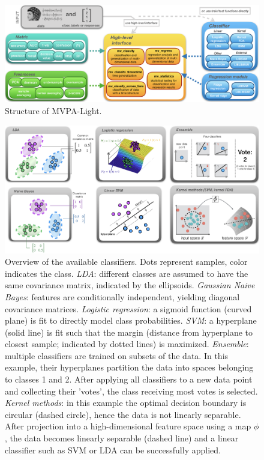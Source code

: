 \documentclass[utf8]{frontiersSCNS} %
\begin{document}
\begin{figure}[ht!]
\centering\includegraphics[width=\linewidth]{fig1_MVPA_structure}
\caption{Structure of MVPA-Light.}\label{fig:structure}
\end{figure}

\begin{figure}[ht!]
\centering\includegraphics[width=\linewidth]{overview_classifiers}
\caption{Overview of the available classifiers. Dots represent samples, color indicates the class. \textit{LDA}: different classes are assumed to have the same covariance matrix, indicated by the ellipsoids. \textit{Gaussian Naive Bayes}: features are conditionally independent, yielding diagonal covariance matrices. \textit{Logistic regression}: a sigmoid function (curved plane) is fit to directly model class probabilities. \textit{SVM}: a hyperplane (solid line) is fit such that the margin (distance from hyperplane to closest sample; indicated by dotted lines) is maximized. \textit{Ensemble}: multiple classifiers are trained on subsets of the data. In this example, their hyperplanes partition the data into spaces belonging to classes 1 and 2. After applying all classifiers to a new data point and collecting their 'votes', the class receiving most votes is selected. \textit{Kernel methods}: in this example the optimal decision boundary is circular (dashed circle), hence the data is not linearly separable. After projection into a high-dimensional feature space using a map $\phi$, the data becomes linearly separable (dashed line) and a linear classifier such as SVM or LDA can be successfully applied.}\label{fig:classifiers}
\end{figure}
\end{document}
